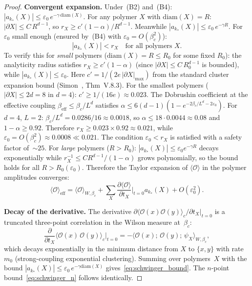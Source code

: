\documentclass[11pt,a4paper]{article}
\theoremstyle{plain}
\theoremstyle{definition}
\theoremstyle{remark}
\newcommand{\diam}{\mathrm{diam}}
\begin{document}
\begin{proof}
\smallskip
\noindent\textbf{Convergent expansion.}
Under~(B2) and~(B4):
$|a_{k_*}(X)| \leq \varepsilon_0\,e^{-\gamma\,\diam(X)}$.
For any polymer $X$ with $\diam(X) = R$:
$|\partial X| \leq C\,R^{d-1}$, so
$r_X \geq c'(1-\alpha)/R^{d-1}$.  Meanwhile
$|a_{k_*}(X)| \leq \varepsilon_0\,e^{-\gamma R}$.
For $\varepsilon_0$ small enough (ensured by~(B4)
with $\varepsilon_0 = O(\beta_c^2)$):
\begin{equation}
  |a_{k_*}(X)| < r_X
  \quad \text{for all polymers } X.
\end{equation}
To verify this for \emph{small} polymers ($\diam(X) = R
\leq R_0$ for some fixed $R_0$):
the analyticity radius satisfies $r_X \geq c'(1 - \alpha)$
(since $|\partial X| \leq C\,R_0^{d-1}$ is bounded),
while $|a_{k_*}(X)| \leq \varepsilon_0$.
Here $c' = 1/(2e\,|\partial X|_{\max})$ from
the standard cluster expansion bound
(Simon~\cite{Simon_statistical}, Thm~V.8.3).
For the smallest polymers ($|\partial X| \leq 2d = 8$
in $d = 4$): $c' \geq 1/(16e) \approx 0.023$.
The Dobrushin coefficient at the effective coupling
$\beta_{\mathrm{eff}} \leq \beta_c/L^d$ satisfies
$\alpha \leq 6(d{-}1)(1 - e^{-2\beta_c/L^d - 2\varepsilon_0})$.
For $d = 4$, $L = 2$:
$\beta_c/L^d = 0.0286/16 \approx 0.0018$, so
$\alpha \leq 18 \cdot 0.0044 \approx 0.08$
and $1 - \alpha \geq 0.92$.
Therefore $r_X \geq 0.023 \times 0.92 \approx 0.021$,
while $\varepsilon_0 = O(\beta_c^2) \approx 0.0008 \ll 0.021$.
The condition $\varepsilon_0 < r_X$ is satisfied with
a safety factor of~${\sim}25$.
For \emph{large} polymers ($R > R_0$):
$|a_{k_*}(X)| \leq \varepsilon_0 e^{-\gamma R}$
decays exponentially while $r_X^{-1} \leq
C R^{d-1}/(1-\alpha)$ grows polynomially, so the
bound holds for all $R > R_0(\varepsilon_0)$.
Therefore the Taylor expansion of
$\langle\mathcal{O}\rangle$ in the polymer amplitudes
converges:
\begin{equation}\label{eq:taylor_polymer}
  \langle \mathcal{O}\rangle_{\mathrm{eff}}
  = \langle \mathcal{O} \rangle_{W,\beta_c}
  + \sum_X \frac{\partial\langle\mathcal{O}\rangle}
  {\partial t_X}\bigg|_{t=0} a_{k_*}(X)
  + O(\varepsilon_0^2).
\end{equation}

\smallskip
\noindent\textbf{Decay of the derivative.}
The derivative $\partial\langle\mathcal{O}(x)
\mathcal{O}(y)\rangle_c / \partial t_X|_{t=0}$
is a truncated three-point correlation in the Wilson
measure at~$\beta_c$:
\begin{equation}
  \frac{\partial}{\partial t_X}
  \langle \mathcal{O}(x)\,\mathcal{O}(y)\rangle_c
  \Big|_{t=0}
  = -\langle \mathcal{O}(x);\,\mathcal{O}(y);\,
  \psi_X\rangle_{W,\beta_c},
\end{equation}
which decays exponentially in the minimum distance from
$X$ to $\{x,y\}$ with rate~$m_0$ (strong-coupling
exponential clustering).  Summing over polymers~$X$
with the bound $|a_{k_*}(X)| \leq \varepsilon_0
\,e^{-\gamma\diam(X)}$ gives~\eqref{eq:schwinger_bound}.
The $n$-point bound~\eqref{eq:schwinger_n} follows
identically.
\end{proof}
\end{document}
